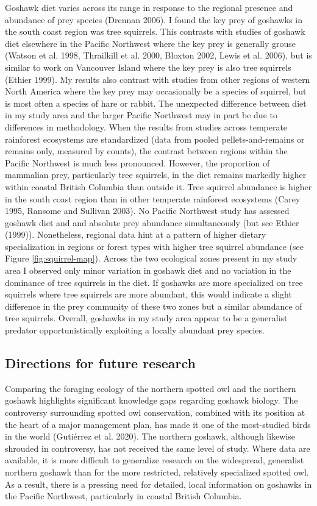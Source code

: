 \documentclass{sfuthesis}
\begin{document}
Goshawk diet varies across its range in response to the regional presence and abundance of prey species (Drennan 2006). I found the key prey of goshawks in the south coast region was tree squirrels. This contrasts with studies of goshawk diet elsewhere in the Pacific Northwest where the key prey is generally grouse (Watson et al. 1998, Thrailkill et al. 2000, Bloxton 2002, Lewis et al. 2006), but is similar to work on Vancouver Island where the key prey is also tree squirrels (Ethier 1999). My results also contrast with studies from other regions of western North America where the key prey may occasionally be a species of squirrel, but is most often a species of hare or rabbit. The unexpected difference between diet in my study area and the larger Pacific Northwest may in part be due to differences in methodology. When the results from studies across temperate rainforest ecosystems are standardized (data from pooled pellets-and-remains or remains only, measured by counts), the contrast between regions within the Pacific Northwest is much less pronounced. However, the proportion of mammalian prey, particularly tree squirrels, in the diet remains markedly higher within coastal British Columbia than outside it. Tree squirrel abundance is higher in the south coast region than in other temperate rainforest ecosystems (Carey 1995, Ransome and Sullivan 2003). No Pacific Northwest study has assessed goshawk diet and and absolute prey abundance simultaneously (but see Ethier (1999)). Nonetheless, regional data hint at a pattern of higher dietary specialization in regions or forest types with higher tree squirrel abundance (see Figure \ref{fig:squirrel-map}). Across the two ecological zones present in my study area I observed only minor variation in goshawk diet and no variation in the dominance of tree squirrels in the diet. If goshawks are more specialized on tree squirrels where tree squirrels are more abundant, this would indicate a slight difference in the prey community of these two zones but a similar abundance of tree squirrels. Overall, goshawks in my study area appear to be a generalist predator opportunistically exploiting a locally abundant prey species.

\hypertarget{directions-for-future-research}{%
\subsection{Directions for future research}\label{directions-for-future-research}}

Comparing the foraging ecology of the northern spotted owl and the northern goshawk highlights significant knowledge gaps regarding goshawk biology. The controversy surrounding spotted owl conservation, combined with its position at the heart of a major management plan, has made it one of the most-studied birds in the world (Gutiérrez et al. 2020). The northern goshawk, although likewise shrouded in controversy, has not received the same level of study. Where data are available, it is more difficult to generalize research on the widespread, generalist northern goshawk than for the more restricted, relatively specialized spotted owl. As a result, there is a pressing need for detailed, local information on goshawks in the Pacific Northwest, particularly in coastal British Columbia.
\end{document}
